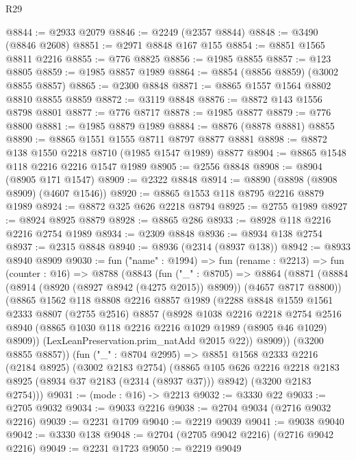 \begin{lexlean}{R29}
\begin{coremodule}
@8844 := @2933 @2079
@8846 := @2249 (@2357 @8844)
@8848 := @3490 (@8846 @2608)
@8851 := @2971 @8848 @167 @155
@8854 := @8851 @1565 @8811 @2216
@8855 := @776 @8825
@8856 := @1985 @8855
@8857 := @123 @8805
@8859 := @1985 @8857 @1989
@8864 := @8854 (@8856 @8859) (@3002 @8855 @8857)
@8865 := @2300 @8848
@8871 := @8865 @1557 @1564 @8802 @8810 @8855 @8859
@8872 := @3119 @8848
@8876 := @8872 @143 @1556 @8798 @8801
@8877 := @776 @8717
@8878 := @1985 @8877
@8879 := @776 @8800
@8881 := @1985 @8879 @1989
@8884 := @8876 (@8878 @8881) @8855
@8890 := @8865 @1551 @1555 @8711 @8797 @8877 @8881
@8898 := @8872 @138 @1550 @2218 @8710 (@1985 @1547 @1989) @8877
@8904 := @8865 @1548 @118 @2216 @2216 @1547 @1989
@8905 := @2556 @8848
@8908 := @8904 (@8905 @171 @1547)
@8909 := @2322 @8848
@8914 := @8890 (@8898 (@8908 @8909) (@4607 @1546))
@8920 := @8865 @1553 @118 @8795 @2216 @8879 @1989
@8924 := @8872 @325 @626 @2218 @8794
@8925 := @2755 @1989
@8927 := @8924 @8925 @8879
@8928 := @8865 @286
@8933 := @8928 @118 @2216 @2216 @2754 @1989
@8934 := @2309 @8848
@8936 := @8934 @138 @2754
@8937 := @2315 @8848
@8940 := @8936 (@2314 (@8937 @138))
@8942 := @8933 @8940 @8909
@9030 := fun ("name" : @1994) =>
  fun (rename : @2213) =>
  fun (counter : @16) =>
  @8788
    (@8843
      (fun ("_" : @8705) =>
      @8864
        (@8871
          (@8884 (@8914 (@8920 (@8927 @8942 (@4275 @2015)) @8909)) (@4657 @8717 @8800))
          (@8865
            @1562
            @118
            @8808
            @2216
            @8857
            @1989
            (@2288
              @8848
              @1559
              @1561
              @2333
              @8807
              (@2755 @2516)
              @8857
              (@8928
                @1038
                @2216
                @2218
                @2754
                @2516
                @8940
                (@8865 @1030 @118 @2216 @2216 @1029 @1989 (@8905 @46 @1029) @8909))
              (LexLeanPreservation.prim_natAdd @2015 @22))
            @8909))
        (@3200 @8855 @8857))
      (fun ("_" : @8704 @2995) =>
      @8851
        @1568
        @2333
        @2216
        (@2184 @8925)
        (@3002 @2183 @2754)
        (@8865 @105 @626 @2216 @2218 @2183 @8925 (@8934 @37 @2183 (@2314 (@8937 @37))) @8942)
        (@3200 @2183 @2754)))
@9031 := (mode : @16) -> @2213
@9032 := @3330 @22
@9033 := @2705 @9032
@9034 := @9033 @2216
@9038 := @2704 @9034 (@2716 @9032 @2216)
@9039 := @2231 @1709
@9040 := @2219 @9039
@9041 := @9038 @9040
@9042 := @3330 @138
@9048 := @2704 (@2705 @9042 @2216) (@2716 @9042 @2216)
@9049 := @2231 @1723
@9050 := @2219 @9049

\end{coremodule}
\end{lexlean}
